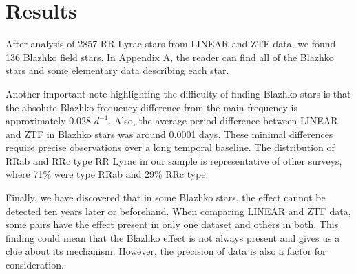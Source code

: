 
\section{Results}\label{sec:results}
After analysis of 2857 RR Lyrae stars from LINEAR and ZTF data, we found 136 Blazhko field stars. In Appendix A, the reader can find all of the Blazhko stars and some elementary data describing each star. 

Another important note highlighting the difficulty of finding Blazhko stars is that the absolute Blazhko frequency difference from the main frequency is approximately 0.028 $d^{-1}$. Also, the average period difference between LINEAR and ZTF in Blazhko stars was around 0.0001 days. These minimal differences require precise observations over a long temporal baseline. The distribution of RRab and RRc type RR Lyrae in our sample is representative of other surveys, where 71\% were type RRab and 29\% RRc type.

Finally, we have discovered that in some Blazhko stars, the effect cannot be detected ten years later or beforehand. When comparing LINEAR and ZTF data, some pairs have the effect present in only one dataset and others in both. This finding could mean that the Blazhko effect is not always present and gives us a clue about its mechanism. However, the precision of data is also a factor for consideration. 
